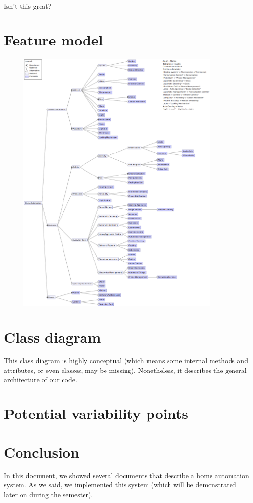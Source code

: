 			Isn't this great?
		
	\section{Feature model}		
        \begin{figure}[H]
            \includegraphics[width=0.9\textwidth]{FeatureModel_2.png}
        \end{figure}
	
	\section{Class diagram}
		This class diagram is highly conceptual (which means some internal methods and attributes, or even classes, may be missing). Nonetheless, it describes the general architecture of our code.
		
		
	\section{Potential variability points}
	
	\section{Conclusion}
		In this document, we showed several documents that describe a home automation system.
		As we said, we implemented this system (which will be demonstrated later on during the semester).


